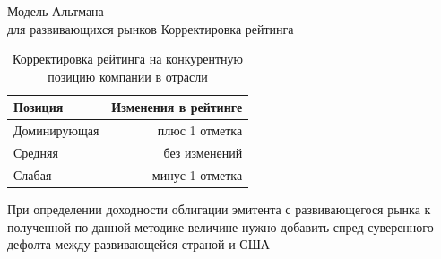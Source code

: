 \documentclass[_Banking_p2.tex]{subfiles}
\begin{document}
\begin{frame}{Модель Альтмана\\ для развивающихся рынков}
{Корректировка рейтинга}
\begin{table}[htbp]
\centering
\caption{Корректировка рейтинга на конкурентную позицию компании в отрасли}
\begin{tabular}{lr}
\toprule
Позиция & Изменения в рейтинге \\
\midrule
Доминирующая & плюс 1 отметка \\
Средняя & без изменений \\
Слабая & минус 1 отметка \\
\bottomrule
\end{tabular}%
\label{tab:addlabel}%
\end{table}%

При определении доходности облигации эмитента с развивающегося рынка к полученной по данной методике величине нужно добавить спред суверенного дефолта между развивающейся страной и США	

\end{frame}
\end{document}
